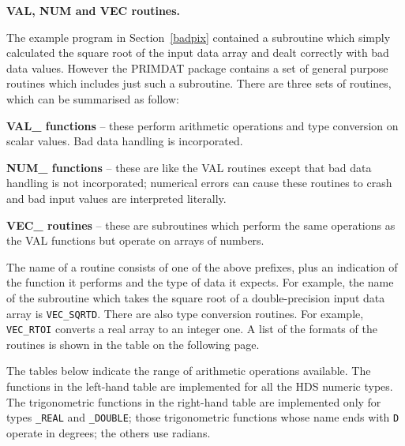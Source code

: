 {\bigskip\large\bf VAL, NUM and VEC routines.}

The example program in Section~\ref{badpix} contained a subroutine 
which simply calculated the square root of the input data array and 
dealt correctly with bad data values.
However the PRIMDAT package contains a set of general purpose routines
which includes just such a subroutine.
There are three sets of routines, which can be summarised as follow:
\begin{description}
\item{ \bf VAL\_ functions} -- these perform arithmetic operations and type 
conversion on scalar values. Bad data handling is incorporated.
\item{\bf NUM\_ functions} -- these are like the VAL routines except that bad 
data handling is not incorporated; numerical errors can cause these 
routines to crash and bad input values are interpreted literally. 
\item{\bf VEC\_ routines} -- these are subroutines which perform the
same operations as the VAL functions but operate on arrays of numbers.
\end{description}

The name of a routine consists of one of the above prefixes, plus an 
indication of the function it performs and the type of data it expects.
For example, the name of the subroutine which takes the square root of a
double-precision input data array is {\tt VEC\_SQRTD}.
There are also type conversion routines. For example, {\tt VEC\_RTOI}
converts a real array to an integer one.
A list of the formats of the routines is shown in the table on the following 
page.

The tables below indicate the range of arithmetic operations available.
The functions in the left-hand table are implemented for all the HDS 
numeric types.
The trigonometric functions in the right-hand table are implemented only 
for types {\tt\_REAL} and {\tt\_DOUBLE}; those trigonometric 
functions whose name 
ends with {\tt D} operate in degrees; the others use radians.

